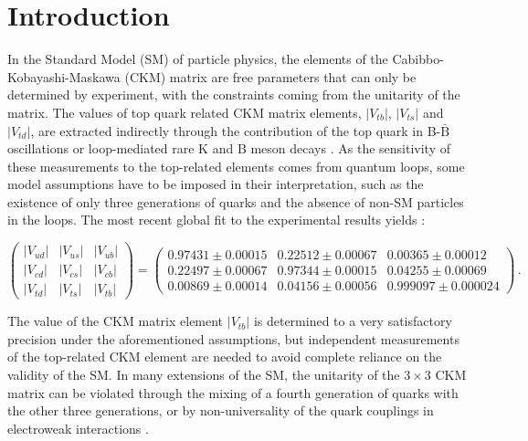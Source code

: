 \documentclass[11pt]{article}
\newcommand{\VUD}{|V_{ud}|}
\newcommand{\VUS}{|V_{us}|}
\newcommand{\VUB}{|V_{ub}|}
\newcommand{\VCD}{|V_{cd}|}
\newcommand{\VCS}{|V_{cs}|}
\newcommand{\VCB}{|V_{cb}|}
\newcommand{\VTD}{|V_{td}|}
\newcommand{\VTS}{|V_{ts}|}
\newcommand{\VTB}{|V_{tb}|}
\begin{document}
\clearpage

\section{Introduction}
\label{sec:intro}

In the Standard Model (SM) of particle physics, the elements of the Cabibbo-Kobayashi-Maskawa (CKM) matrix  \cite{Cabibbo:1963yz} are free parameters that can only be determined by experiment, with the constraints coming from the unitarity of the matrix. The values of top quark related CKM matrix elements, $\VTB$, $\VTS$ and $\VTD$, are extracted indirectly through the contribution of the top quark in B-$\bar{\text{B}}$ oscillations or loop-mediated rare K  and B meson decays \cite{Patrignani:2016xqp,Charles:2004jd}.
As the sensitivity of these measurements to the top-related elements comes from quantum loops, some model assumptions have to be imposed in their interpretation, such as the existence of only three generations of quarks and the absence of non-SM particles in the loops. The most recent global fit to the experimental results yields \cite{utfit,Charles:2015gya}:

\begin{equation}
  \left( \begin{array}{ccc}
      \VUD & \VUS  &  \VUB  \\
      \VCD & \VCS  &  \VCB  \\
     \VTD & \VTS  &  \VTB
   \end{array}  \right)    =
  \left( \begin{array}{ccc}
      0.97431 \pm 0.00015 & 0.22512 \pm 0.00067  &  0.00365 \pm 0.00012  \\
      0.22497 \pm 0.00067 & 0.97344 \pm  0.00015  &  0.04255 \pm 0.00069  \\
      0.00869 \pm 0.00014 & 0.04156 \pm 0.00056  &  0.999097 \pm 0.000024
   \end{array}  \right) \,.
  \label{eq:ckm}
\end{equation}


The value of the CKM matrix element $\VTB$ is determined to a very satisfactory precision  under the aforementioned assumptions, but independent measurements of the top-related CKM element are needed to avoid complete reliance on the validity of the SM. In many extensions of the SM, the unitarity of the $3\times 3$ CKM matrix can be violated through the mixing of a fourth generation of quarks with the other three generations, or by non-universality of the quark couplings in electroweak interactions \cite{Alwall:2006bx}.
\end{document}
